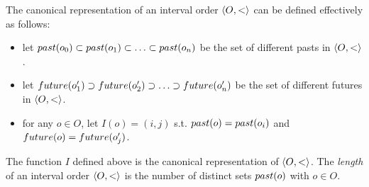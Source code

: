 The canonical representation of an interval order $\left\langle {O,<} \right\rangle$ can be defined
effectively as follows:
\begin{itemize}

	\item let $past({o_0})\subset past({o_1})\subset \ldots\subset
past({o_n})$ be the set of different pasts in $\left\langle {O,<} \right\rangle$. 

	\item let $future({o_1'})\supset future({o_2'})\supset \ldots\supset
future({o_n'})$ be the set of different futures in $\left\langle {O,<} \right\rangle$.

	\item for any $o\in O$, let $I(o)=(i,j)$ s.t. $past({o})=past({o_i})$ and
$future({o})=future({o_j'})$.

\end{itemize}

\begin{lemma}

  The function $I$ defined above is the canonical representation of
  $\left\langle {O,<} \right\rangle$. The \emph{length} of an interval order $\left\langle {O,<} \right\rangle$ is the number
  of distinct sets $past({o})$ with $o\in O$.

\end{lemma}




